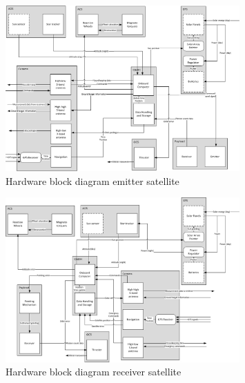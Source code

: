 \begin{figure}
\includegraphics[width=0.8\textwidth, angle=90]{chapters/img/emitterHWblock.jpg}
\caption{Hardware block diagram emitter satellite}
\label{HWblockemitter}
\end{figure}

\begin{figure}
\includegraphics[width=0.8\textwidth, angle=90]{chapters/img/receiverHWblock.jpg}
\caption{Hardware block diagram receiver satellite}
\label{HWblockreceiver}
\end{figure}